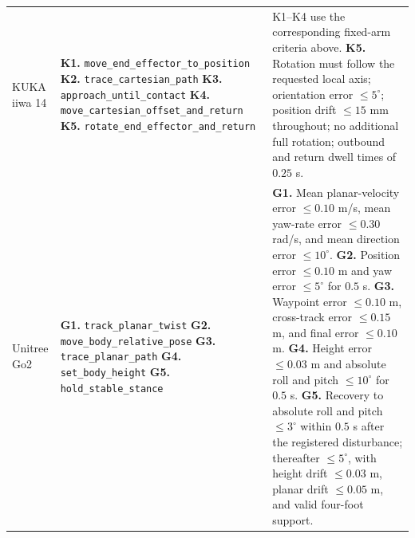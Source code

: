 \begin{longtable}{@{}>{\raggedright\arraybackslash}p{}
                        >{\raggedright\arraybackslash}p{}
                        >{\raggedright\arraybackslash}p{}@{}}
KUKA iiwa 14
&
\textbf{K1.} \texttt{move\_end\_effector\_to\_position}\newline
\textbf{K2.} \texttt{trace\_cartesian\_path}\newline
\textbf{K3.} \texttt{approach\_until\_contact}\newline
\textbf{K4.} \texttt{move\_cartesian\_offset\_and\_return}\newline
\textbf{K5.} \texttt{rotate\_end\_effector\_and\_return}
&
K1--K4 use the corresponding fixed-arm criteria above.\newline
\textbf{K5.} Rotation must follow the requested local axis; orientation
error $\leq 5^{\circ}$; position drift $\leq 15$ mm throughout; no
additional full rotation; outbound and return dwell times of $0.25$ s.
\\[3pt]

Unitree Go2
&
\textbf{G1.} \texttt{track\_planar\_twist}\newline
\textbf{G2.} \texttt{move\_body\_relative\_pose}\newline
\textbf{G3.} \texttt{trace\_planar\_path}\newline
\textbf{G4.} \texttt{set\_body\_height}\newline
\textbf{G5.} \texttt{hold\_stable\_stance}
&
\textbf{G1.} Mean planar-velocity error $\leq 0.10$ m/s, mean yaw-rate
error $\leq 0.30$ rad/s, and mean direction error $\leq 10^{\circ}$.\newline
\textbf{G2.} Position error $\leq 0.10$ m and yaw error $\leq 5^{\circ}$
for $0.5$ s.\newline
\textbf{G3.} Waypoint error $\leq 0.10$ m, cross-track error
$\leq 0.15$ m, and final error $\leq 0.10$ m.\newline
\textbf{G4.} Height error $\leq 0.03$ m and absolute roll and pitch
$\leq 10^{\circ}$ for $0.5$ s.\newline
\textbf{G5.} Recovery to absolute roll and pitch $\leq 3^{\circ}$ within
$0.5$ s after the registered disturbance; thereafter $\leq 5^{\circ}$,
with height drift $\leq 0.03$ m, planar drift $\leq 0.05$ m, and valid
four-foot support.
\\[3pt]


\end{longtable}
